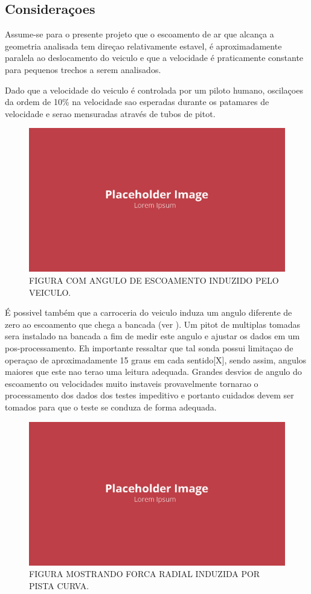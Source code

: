 \subsection{Consideraçoes}

Assume-se para o presente projeto que o escoamento de ar que alcança a geometria analisada tem direçao relativamente estavel, é aproximadamente paralela ao deslocamento do veiculo e que a velocidade é praticamente constante para pequenos trechos a serem analisados.

Dado que a velocidade do veiculo é controlada por um piloto humano, oscilaçoes da ordem de 10\% na velocidade sao esperadas durante os patamares de velocidade e serao mensuradas através de tubos de pitot.

\begin{figure}[!ht]
    \centering
    \includegraphics[width=.8\linewidth]{figuras/placeholder.png}
    \caption{FIGURA COM ANGULO DE ESCOAMENTO INDUZIDO PELO VEICULO\cite{autor}.}
    \label{fig:vehicle-angle}
\end{figure}

É possivel também que a carroceria do veiculo induza um angulo diferente de zero ao escoamento que chega a bancada (ver ). Um pitot de multiplas tomadas sera instalado na bancada a fim de medir este angulo e ajustar os dados em um pos-processamento. Eh importante ressaltar que tal sonda  possui limitaçao de operaçao de aproximadamente 15 graus em cada sentido[X], sendo assim, angulos maiores que este nao terao uma leitura adequada. Grandes desvios de angulo do escoamento ou velocidades muito instaveis provavelmente tornarao o processamento dos dados dos testes impeditivo e portanto cuidados devem ser tomados para que o teste se conduza de forma adequada.

\begin{figure}[!ht]
    \centering
    \includegraphics[width=.8\linewidth]{figuras/placeholder.png}
    \caption{FIGURA MOSTRANDO FORCA RADIAL INDUZIDA POR PISTA CURVA\cite{autor}.}
    \label{fig:placeholder}
\end{figure}

